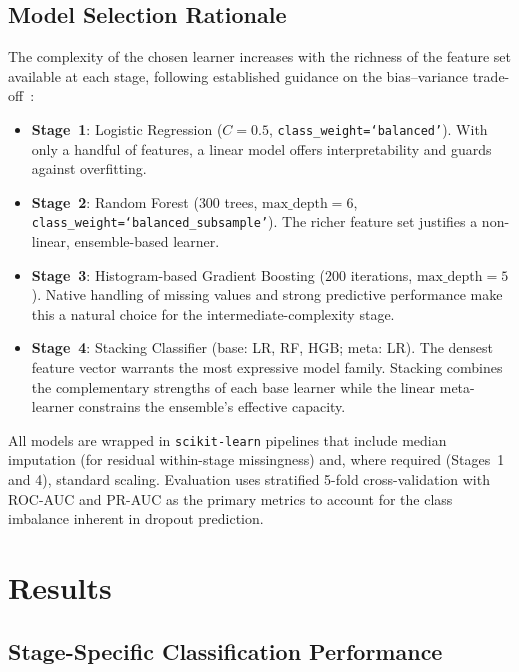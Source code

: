 \documentclass[8pt,twocolumn]{extarticle}
\begin{document}
\subsection{Model Selection Rationale}\label{subsec:models}

The complexity of the chosen learner increases with the richness of the feature
set available at each stage, following established guidance on the
bias--variance trade-off~\cite{hastie2009elements}:

\begin{itemize}
  \item \textbf{Stage~1}: Logistic Regression ($C = 0.5$, \texttt{class\_weight=`balanced'}).
        With only a handful of features, a linear model offers interpretability
        and guards against overfitting.
  \item \textbf{Stage~2}: Random Forest ($300$ trees, $\text{max\_depth} = 6$,
        \texttt{class\_weight=`balanced\_subsample'}).
        The richer feature set justifies a non-linear, ensemble-based learner.
  \item \textbf{Stage~3}: Histogram-based Gradient Boosting ($200$ iterations,
        $\text{max\_depth} = 5$).
        Native handling of missing values and strong predictive performance
        make this a natural choice for the intermediate-complexity stage.
  \item \textbf{Stage~4}: Stacking Classifier (base: LR, RF, HGB; meta: LR).
        The densest feature vector warrants the most expressive model family.
        Stacking combines the complementary strengths of each base learner
        while the linear meta-learner constrains the ensemble's effective
        capacity.
\end{itemize}

All models are wrapped in \texttt{scikit-learn} pipelines that include
median imputation (for residual within-stage missingness) and, where required
(Stages~1 and 4), standard scaling.  Evaluation uses stratified 5-fold
cross-validation with ROC-AUC and PR-AUC as the primary metrics to account
for the class imbalance inherent in dropout prediction.

\section{Results}\label{sec:results}

\subsection{Stage-Specific Classification Performance}
\end{document}
